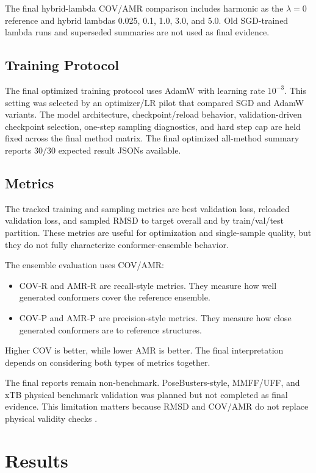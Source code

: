 \documentclass[11pt]{article}
\begin{document}
The final hybrid-lambda COV/AMR comparison includes harmonic as the $\lambda=0$ reference and hybrid lambdas 0.025, 0.1, 1.0, 3.0, and 5.0. Old SGD-trained lambda runs and superseded summaries are not used as final evidence.

\subsection{Training Protocol}

The final optimized training protocol uses AdamW with learning rate $10^{-3}$. This setting was selected by an optimizer/LR pilot that compared SGD and AdamW variants. The model architecture, checkpoint/reload behavior, validation-driven checkpoint selection, one-step sampling diagnostics, and hard step cap are held fixed across the final method matrix. The final optimized all-method summary reports 30/30 expected result JSONs available.

\subsection{Metrics}

The tracked training and sampling metrics are best validation loss, reloaded validation loss, and sampled RMSD to target overall and by train/val/test partition. These metrics are useful for optimization and single-sample quality, but they do not fully characterize conformer-ensemble behavior.

The ensemble evaluation uses COV/AMR:
\begin{itemize}
    \item COV-R and AMR-R are recall-style metrics. They measure how well generated conformers cover the reference ensemble.
    \item COV-P and AMR-P are precision-style metrics. They measure how close generated conformers are to reference structures.
\end{itemize}
Higher COV is better, while lower AMR is better. The final interpretation depends on considering both types of metrics together.

The final reports remain non-benchmark. PoseBusters-style, MMFF/UFF, and xTB physical benchmark validation was planned but not completed as final evidence. This limitation matters because RMSD and COV/AMR do not replace physical validity checks \cite{posebusters}.

\section{Results}
\end{document}

